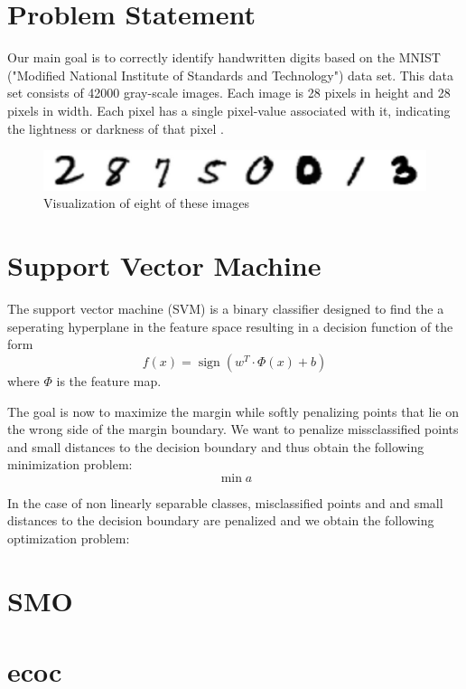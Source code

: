 \documentclass[12pt, a4paper, openany, bibliography=totoc]{report} %
\theoremstyle{definition}
\numberwithin{equation}{chapter}
\DeclareMathOperator{\sign}{sign}
\begin{document}
\cleardoublepage
  \pagestyle{plain}

\chapter*{Problem Statement}
Our main goal is to correctly identify handwritten digits based on the MNIST  ("Modified National Institute of Standards and Technology") data set.
This data set consists of 42000 gray-scale images. Each image is 28 pixels in height and 28 pixels in width. Each pixel has a single pixel-value associated with it, indicating the lightness or darkness of that pixel \cite{kaggel}.

\begin{figure}[h]
	\includegraphics[width=1\textwidth, center]{Digits2}
	\caption{Visualization of eight of these images}
\end{figure}




\chapter*{Support Vector Machine}
The support vector machine (SVM) is a binary classifier designed to find the a seperating hyperplane in the feature space resulting in a decision function of the form 
$$f(x) = \sign(w^T \cdot \Phi(x) + b)$$
where $\Phi$ is the feature map. 

The goal is now to maximize the margin while softly penalizing points that lie
on the wrong side of the margin boundary.
We want to penalize missclassified points and small distances to the decision boundary and thus obtain the following minimization problem:
$$\min{a}$$


In the case of non linearly separable classes, misclassified points and and small distances to the decision boundary are penalized and we obtain the following optimization problem:




\chapter*{SMO}


\chapter*{ecoc}
\end{document}
